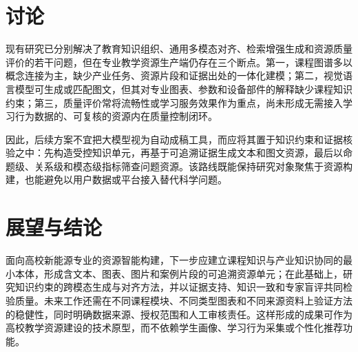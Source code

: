 \documentclass[UTF8,11pt]{ctexart}
\begin{document}
\section{讨论}
现有研究已分别解决了教育知识组织、通用多模态对齐、检索增强生成和资源质量评价的若干问题，但在专业教学资源生产端仍存在三个断点。第一，课程图谱多以概念连接为主，缺少产业任务、资源片段和证据出处的一体化建模；第二，视觉语言模型可生成或匹配图文，但其对专业图表、参数和设备部件的解释缺少课程知识约束；第三，质量评价常将流畅性或学习服务效果作为重点，尚未形成无需接入学习行为数据的、可复核的资源内在质量控制闭环。

因此，后续方案不宜把大模型视为自动成稿工具，而应将其置于知识约束和证据核验之中：先构造受控知识单元，再基于可追溯证据生成文本和图文资源，最后以命题级、关系级和模态级指标筛查问题资源。该路线既能保持研究对象聚焦于资源构建，也能避免以用户数据或平台接入替代科学问题。

\section{展望与结论}
面向高校新能源专业的资源智能构建，下一步应建立课程知识与产业知识协同的最小本体，形成含文本、图表、图片和案例片段的可追溯资源单元；在此基础上，研究知识约束的跨模态生成与对齐方法，并以证据支持、知识一致和专家盲评共同检验质量。未来工作还需在不同课程模块、不同类型图表和不同来源资料上验证方法的稳健性，同时明确数据来源、授权范围和人工审核责任。这样形成的成果可作为高校教学资源建设的技术原型，而不依赖学生画像、学习行为采集或个性化推荐功能。



\end{document}
